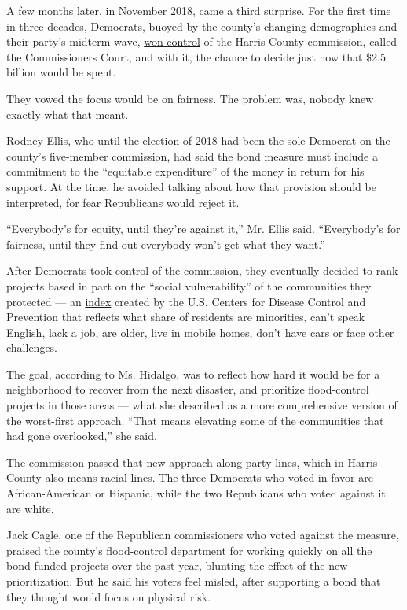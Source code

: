 A few months later, in November 2018, came a third surprise. For the
first time in three decades, Democrats, buoyed by the county's changing
demographics and their party's midterm wave,
\href{https://www.houstonchronicle.com/news/houston-texas/houston/article/Emmett-threatened-by-Democratic-rout-in-Harris-13369367.php}{won
control} of the Harris County commission, called the Commissioners
Court, and with it, the chance to decide just how that \$2.5 billion
would be spent.

They vowed the focus would be on fairness. The problem was, nobody knew
exactly what that meant.

Rodney Ellis, who until the election of 2018 had been the sole Democrat
on the county's five-member commission, had said the bond measure must
include a commitment to the ``equitable expenditure'' of the money in
return for his support. At the time, he avoided talking about how that
provision should be interpreted, for fear Republicans would reject it.

``Everybody's for equity, until they're against it,'' Mr. Ellis said.
``Everybody's for fairness, until they find out everybody won't get what
they want.''

After Democrats took control of the commission, they eventually decided
to rank projects based in part on the ``social vulnerability'' of the
communities they protected --- an
\href{https://www.ncbi.nlm.nih.gov/pmc/articles/PMC7179070/}{index}
created by the U.S. Centers for Disease Control and Prevention that
reflects what share of residents are minorities, can't speak English,
lack a job, are older, live in mobile homes, don't have cars or face
other challenges.

The goal, according to Ms. Hidalgo, was to reflect how hard it would be
for a neighborhood to recover from the next disaster, and prioritize
flood-control projects in those areas --- what she described as a more
comprehensive version of the worst-first approach. ``That means
elevating some of the communities that had gone overlooked,'' she said.

The commission passed that new approach along party lines, which in
Harris County also means racial lines. The three Democrats who voted in
favor are African-American or Hispanic, while the two Republicans who
voted against it are white.

Jack Cagle, one of the Republican commissioners who voted against the
measure, praised the county's flood-control department for working
quickly on all the bond-funded projects over the past year, blunting the
effect of the new prioritization. But he said his voters feel misled,
after supporting a bond that they thought would focus on physical risk.

